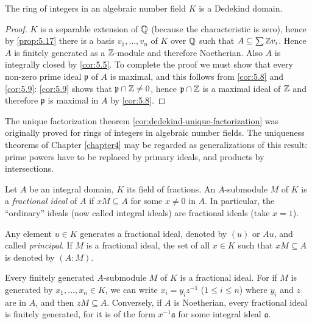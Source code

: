 \begin{theorem}\label{thm:ring-of-integers-dedekind}
The ring of integers in an algebraic number field $K$ is a Dedekind domain.
\end{theorem}

\begin{proof}
$K$ is a separable extension of $\mathbb{Q}$ (because the characteristic is zero), hence by \eqref{prop:5.17} there is a basis $v_1, \ldots, v_n$ of $K$ over $\mathbb{Q}$ such that $A \subseteq \sum \mathbb{Z} v_i$. Hence $A$ is finitely generated as a $\mathbb{Z}$-module and therefore Noetherian. Also $A$ is integrally closed by \eqref{cor:5.5}. To complete the proof we must show that every non-zero prime ideal $\mathfrak{p}$ of $A$ is maximal, and this follows from \eqref{cor:5.8} and \eqref{cor:5.9}: \eqref{cor:5.9} shows that $\mathfrak{p} \cap \mathbb{Z} \neq 0$, hence $\mathfrak{p} \cap \mathbb{Z}$ is a maximal ideal of $\mathbb{Z}$ and therefore $\mathfrak{p}$ is maximal in $A$ by \eqref{cor:5.8}.
\end{proof}

\begin{remark}
The unique factorization theorem \eqref{cor:dedekind-unique-factorization} was originally proved for rings of integers in algebraic number fields. The uniqueness theorems of Chapter \ref{chapter4} may be regarded as generalizations of this result: prime powers have to be replaced by primary ideals, and products by intersections.
\end{remark}

Let $A$ be an integral domain, $K$ its field of fractions. An $A$-submodule $M$ of $K$ is a \emph{fractional ideal} of $A$ if $xM \subseteq A$ for some $x \neq 0$ in $A$. In particular, the ``ordinary'' ideals (now called integral ideals) are fractional ideals (take $x = 1$).

Any element $u \in K$ generates a fractional ideal, denoted by $(u)$ or $Au$, and called \emph{principal}. If $M$ is a fractional ideal, the set of all $x \in K$ such that $xM \subseteq A$ is denoted by $(A : M)$.

Every finitely generated $A$-submodule $M$ of $K$ is a fractional ideal. For if $M$ is generated by $x_1, \ldots, x_n \in K$, we can write $x_i = y_i z^{-1}$ ($1 \leq i \leq n$) where $y_i$ and $z$ are in $A$, and then $zM \subseteq A$. Conversely, if $A$ is Noetherian, every fractional ideal is finitely generated, for it is of the form $x^{-1}\mathfrak{a}$ for some integral ideal $\mathfrak{a}$.

